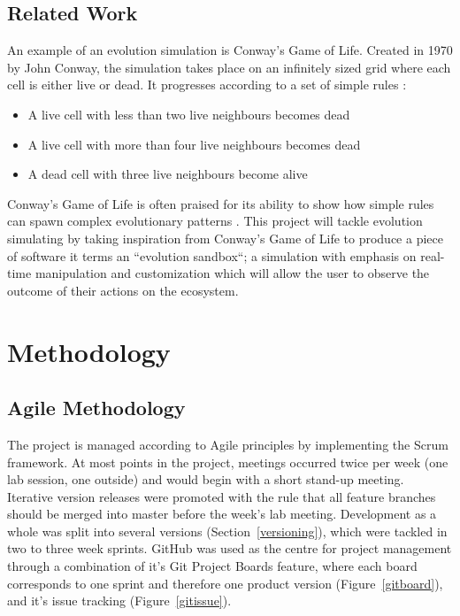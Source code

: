 \documentclass[a4paper, oneside, 11pt]{report}
\begin{document}
\section{Related Work}
An example of an evolution simulation is Conway's Game of Life. Created in 1970 by John Conway, the simulation takes place on an infinitely sized grid where each cell is either live or dead. It progresses according to a set of simple rules \cite{guardian}:
\begin{itemize}
	\item A live cell with less than two live neighbours becomes dead
	\item A live cell with more than four live neighbours becomes dead
	\item A dead cell with three live neighbours become alive
\end{itemize}

Conway's Game of Life is often praised for its ability to show how simple rules can spawn complex evolutionary patterns \cite{callahan}. This project will tackle evolution simulating by taking inspiration from Conway's Game of Life to produce a piece of software it terms an ``evolution sandbox``; a simulation with emphasis on real-time manipulation and customization which will allow the user to observe the outcome of their actions on the ecosystem.

\chapter{Methodology}\label{methodology}

\section{Agile Methodology}\label{projectmanagement}
The project is managed according to Agile principles by implementing the Scrum framework. At most points in the project, meetings occurred twice per week (one lab session, one outside) and would begin with a short stand-up meeting. Iterative version releases were promoted with the rule that all feature branches should be merged into master before the week's lab meeting. Development as a whole was split into several versions (Section~\ref{versioning}), which were tackled in two to three week sprints. GitHub was used as the centre for project management through a combination of it's Git Project Boards feature, where each board corresponds to one sprint and therefore one product version (Figure~\ref{gitboard}), and it's issue tracking (Figure~\ref{gitissue}). 
\end{document}
